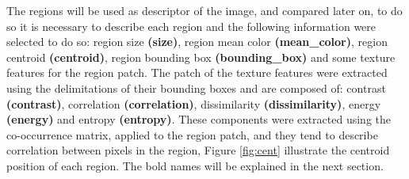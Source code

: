 \documentclass[12pt,a4paper]{article}
\begin{document}
\newpage

	The regions will be used as descriptor of the image, and compared later on, to do so it is necessary to describe each region and the following information were selected to do so: region size \textbf{(size)}, region mean color \textbf{(mean\_color)}, region centroid \textbf{(centroid)}, region bounding box \textbf{(bounding\_box)} and some texture features for the region patch. The patch of the texture features were extracted using the delimitations of their bounding boxes and are composed of: contrast \textbf{(contrast)}, correlation \textbf{(correlation)}, dissimilarity \textbf{(dissimilarity)}, energy \textbf{(energy)} and entropy \textbf{(entropy)}. These components were extracted using the co-occurrence matrix, applied to the region patch, and they tend to describe correlation between pixels in the region, Figure \ref{fig:cent} illustrate the centroid position of each region. The bold names will be explained in the next section.
\end{document}
